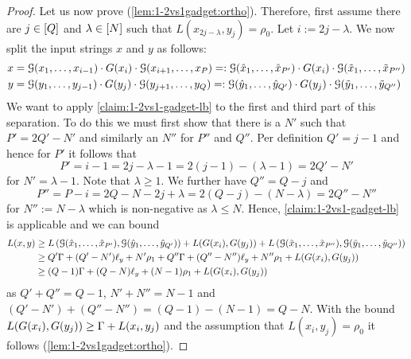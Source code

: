 \begin{proof}
Let us now prove (\ref{lem:1-2vs1gadget:ortho}).
Therefore, first assume there are $j \in [Q]$ and $\lambda \in [N]$ such that $L(x_{2j-\lambda}, y_j) = \rho_0$.
Let $i := 2j - \lambda$.
We now split the input strings $x$ and $y$ as follows:
\begin{align*}
x &= \lLCSGadget{x_1, \ldots, x_{i-1}} \cdot \gLargeLCS{x_i} \cdot \lLCSGadget{x_{i+1}, \ldots, x_P} %
=: \lLCSGadget{\hat{x}_1, \ldots, \hat{x}_{P'}} \cdot \gLargeLCS{x_i} \cdot \lLCSGadget{\tilde{x}_{1}, \ldots, \tilde{x}_{P''}}\\
y &= \lLCSGadget{y_1, \ldots, y_{j-1}} \cdot \gLargeLCS{y_j} \cdot \lLCSGadget{y_{j+1}, \ldots, y_Q} %
=: \lLCSGadget{\hat{y}_1, \ldots, \hat{y}_{Q'}} \cdot \gLargeLCS{y_j} \cdot \lLCSGadget{\tilde{y}_{1}, \ldots, \tilde{y}_{Q''}}
\end{align*}
We want to apply \autoref{claim:1-2vs1-gadget-lb} to the first and third part of this separation.
To do this we must first show that there is a $N'$ such that $P' = 2Q' - N'$ and similarly an $N''$ for $P''$ and $Q''$.
Per definition $Q' = j-1$ and hence for $P'$ it follows that 
\[
P' = i - 1 = 2j - \lambda - 1 = 2(j-1) - (\lambda - 1) = 2Q' - N'
\] 
for $N' = \lambda - 1$. Note that $\lambda \geq 1$.
%
We further have $Q'' = Q - j$ and 
\[
P'' = P - i = 2Q - N - 2j + \lambda = 2(Q-j) - (N - \lambda) = 2Q'' - N''
\]
for $N'' := N - \lambda$ which is non-negative as $\lambda \leq N$.
Hence, \autoref{claim:1-2vs1-gadget-lb} is applicable and we can bound
\begin{align*}
	L(x,y) &\geq L\left( \mathcal{G}(\hat{x}_1, \ldots, \hat{x}_{P'}), \mathcal{G}(\hat{y}_1, \ldots, \hat{y}_{Q'}) \right) + L(G(x_i), G(y_j)) + L\left(\mathcal{G}(\tilde{x}_{1}, \ldots, \tilde{x}_{P''}), \mathcal{G}(\tilde{y}_{1}, \ldots, \tilde{y}_{Q''}) \right)\\
	&\geq Q'\Gamma + (Q' - N')\ell_y + N'\rho_1  + Q''\Gamma + (Q'' - N'')\ell_y + N''\rho_1 + L(G(x_i), G(y_j))\\
	&\geq (Q-1)\Gamma + (Q-N)\ell_y + (N-1)\rho_1 + L(G(x_i), G(y_j))
\end{align*}
as $Q' + Q'' = Q-1$, $N' + N'' = N - 1$ and $(Q' - N') + (Q'' - N'') = (Q-1) - (N -1) = Q-N$.
With the bound $L(G(x_i), G(y_j)) \geq \Gamma + L(x_i, y_j)$ and the assumption that $L(x_i, y_j) = \rho_0$ it follows (\ref{lem:1-2vs1gadget:ortho}).
%
%
%
%
%
%
%
%
%

\end{proof}
